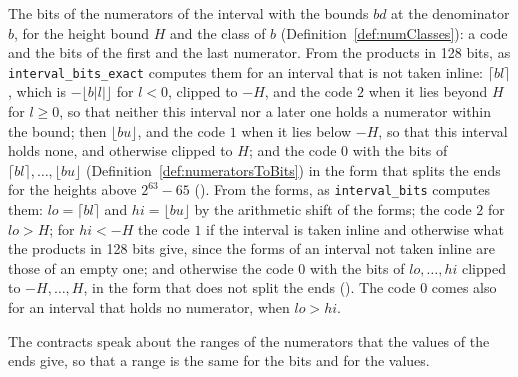 \begin{definition}\label{def:intervalBits}
  \leanok
  The bits of the numerators of the interval with the bounds $\mathit{bd}$ at the denominator $b$,
  for the height bound $H$ and the class of $b$ (Definition~\ref{def:numClasses}): a code and the
  bits of the first and the last numerator. From the products in 128 bits, as
  \verb|interval_bits_exact| computes them for an interval that is not taken inline:
  $\lceil b l \rceil$, which is $-\lfloor b|l| \rfloor$ for $l < 0$, clipped to $-H$, and the code
  $2$ when it lies beyond $H$ for $l \ge 0$, so that neither this interval nor a later one holds a
  numerator within the bound; then $\lfloor b u \rfloor$, and the code $1$ when it lies below $-H$,
  so that this interval holds none, and otherwise clipped to $H$; and the code $0$ with the bits of
  $\lceil b l \rceil, \dots, \lfloor b u \rfloor$ (Definition~\ref{def:numeratorsToBits}) in the
  form that splits the ends for the heights above $2^{63} - 65$
  (). From the forms, as \verb|interval_bits| computes them:
  $\mathit{lo} = \lceil b l \rceil$ and $\mathit{hi} = \lfloor b u \rfloor$ by the arithmetic shift
  of the forms; the code $2$ for $\mathit{lo} > H$; for $\mathit{hi} < -H$ the code $1$ if the
  interval is taken inline and otherwise what the products in 128 bits give, since the forms of an
  interval not taken inline are those of an empty one; and otherwise the code $0$ with the bits of
  $\mathit{lo}, \dots, \mathit{hi}$ clipped to $-H, \dots, H$, in the form that does not split the
  ends (). The code $0$ comes also for an interval that holds no
  numerator, when $\mathit{lo} > \mathit{hi}$.
\end{definition}

The contracts speak about the ranges of the numerators that the values of the ends give, so that a
range is the same for the bits and for the values.


